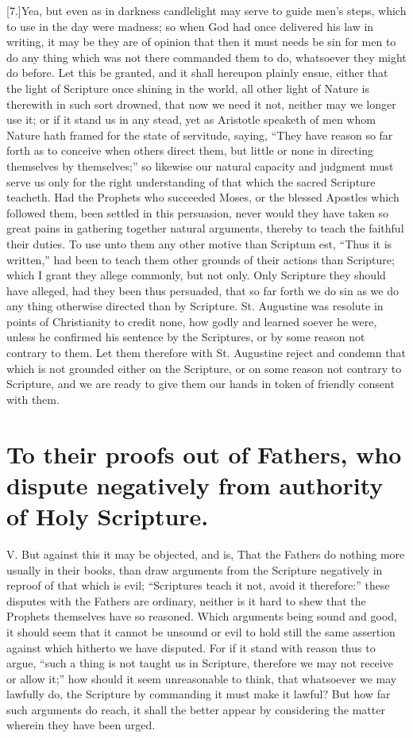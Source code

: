 [7.]Yea, but even as in darkness candlelight may serve to guide men’s steps, which to use in the day were madness; so when God had once delivered his law in writing, it may be they are of opinion that then it must needs be sin for men to do any thing which was not there commanded them to do,  whatsoever they might do before. Let this be granted, and it shall hereupon plainly ensue, either that the light of Scripture once shining in the world, all other light of Nature is therewith in such sort drowned, that now we need it not, neither may we longer use it; or if it stand us in any stead, yet as Aristotle speaketh of men whom Nature hath framed for the state of servitude, saying, “They have reason so far forth as to conceive when others direct them, but little or none in directing themselves by themselves;” so likewise our natural capacity and judgment must serve us only for the right understanding of that which the sacred Scripture teacheth. Had the Prophets who succeeded Moses, or the blessed Apostles which followed them, been settled in this persuasion, never would they have taken so great pains in gathering together natural arguments, thereby to teach the faithful their duties. To use unto them any other motive than Scriptum est, “Thus it is written,” had been to teach them other grounds of their actions than Scripture; which I grant they allege commonly, but not only. Only Scripture they should have alleged, had they been thus persuaded, that so far forth we do sin as we do any thing otherwise directed than by Scripture. St. Augustine was resolute in points of Christianity to credit none, how godly and learned soever he were, unless he confirmed his sentence by the Scriptures, or by some reason not contrary to them. Let them therefore with St. Augustine reject and condemn that which is not grounded either on the Scripture, or on some reason not contrary to Scripture, and we are ready to give them our hands in token of friendly consent with them.

\section*{To their proofs out of Fathers, who dispute negatively from authority of Holy Scripture.}

V. But against this it may be objected, and is, That the Fathers do nothing more usually in their books, than draw  arguments from the Scripture negatively in reproof of that which is evil; “Scriptures teach it not, avoid it therefore:” these disputes with the Fathers are ordinary, neither is it hard to shew that the Prophets themselves have so reasoned. Which arguments being sound and good, it should seem that it cannot be unsound or evil to hold still the same assertion against which hitherto we have disputed. For if it stand with reason thus to argue, “such a thing is not taught us in Scripture, therefore we may not receive or allow it;” how should it seem unreasonable to think, that whatsoever we may lawfully do, the Scripture by commanding it must make it lawful? But how far such arguments do reach, it shall the better appear by considering the matter wherein they have been urged.

